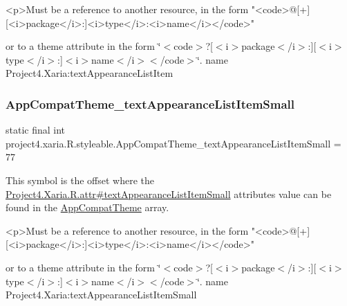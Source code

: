 \begin{DoxyVerb}      <p>Must be a reference to another resource, in the form "<code>@[+][<i>package</i>:]<i>type</i>:<i>name</i></code>"
\end{DoxyVerb}
 or to a theme attribute in the form \char`\"{}$<$code$>$?\mbox{[}$<$i$>$package$<$/i$>$\+:\mbox{]}\mbox{[}$<$i$>$type$<$/i$>$\+:\mbox{]}$<$i$>$name$<$/i$>$$<$/code$>$\char`\"{}.  name Project4.\+Xaria\+:text\+Appearance\+List\+Item \mbox{\label{classproject4_1_1xaria_1_1R_1_1styleable_adc238aae83f2e253317ab04cf7aa7ef5}} 
\subsubsection{\texorpdfstring{App\+Compat\+Theme\+\_\+text\+Appearance\+List\+Item\+Small}{AppCompatTheme\_textAppearanceListItemSmall}}
{\footnotesize\ttfamily static final int project4.\+xaria.\+R.\+styleable.\+App\+Compat\+Theme\+\_\+text\+Appearance\+List\+Item\+Small = 77\hspace{0.3cm}{\ttfamily [static]}}

This symbol is the offset where the \hyperlink{}{Project4.\+Xaria.\+R.\+attr\#text\+Appearance\+List\+Item\+Small} attribute\textquotesingle{}s value can be found in the \hyperlink{classproject4_1_1xaria_1_1R_1_1styleable_aad8bec413e2350f9404e6ff0e831a85d}{App\+Compat\+Theme} array.

\begin{DoxyVerb}      <p>Must be a reference to another resource, in the form "<code>@[+][<i>package</i>:]<i>type</i>:<i>name</i></code>"
\end{DoxyVerb}
 or to a theme attribute in the form \char`\"{}$<$code$>$?\mbox{[}$<$i$>$package$<$/i$>$\+:\mbox{]}\mbox{[}$<$i$>$type$<$/i$>$\+:\mbox{]}$<$i$>$name$<$/i$>$$<$/code$>$\char`\"{}.  name Project4.\+Xaria\+:text\+Appearance\+List\+Item\+Small \mbox{\label{classproject4_1_1xaria_1_1R_1_1styleable_ac77446b89989c34ed15642f5e5860c71}} 
